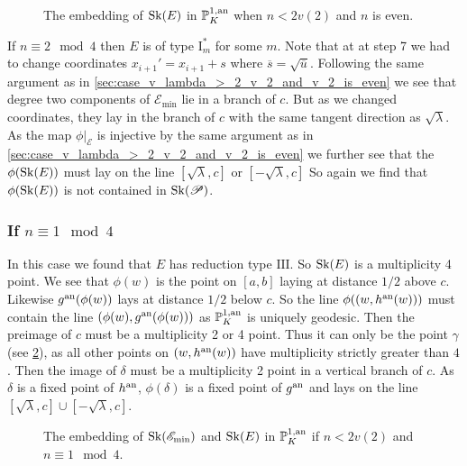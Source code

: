 \begin{figure}[h]
    \centering
    \caption{The embedding of $\operatorname{Sk}(E)$ in $\mathbb{P}^{1, \text{an}}_K$ when $n < 2v(2)$ and  $n$ is even.}
    \label{fig:image_skeleton_wild_n_le_2v2_n_even}
\end{figure}
\medskip 
If $n \equiv 2 \mod 4$ then $E$ is of type $\mathrm I_{m}^*$ for some $m$. 
Note that at at step 7 we had to change coordinates $x_{i+1}' = x_{i + 1}  + s$ where $\overline{s} = \sqrt{\overline{u}} $. 
Following the same argument as in \cref{sec:case_v_lambda_>_2_v_2_and_v_2_is_even} we see that degree two components of $\mathscr E_\text{min} $ lie in a branch of $c$. 
But as we changed coordinates, they lay in the branch of $c$ with the same tangent direction as $\sqrt{\lambda} $. 
As the map $\phi|_{\mathscr E}$ is injective by the same argument as in \cref{sec:case_v_lambda_>_2_v_2_and_v_2_is_even} we further see that the $\phi(\sk(E))$ must lay on the line $[\sqrt{\lambda}, c] $ or $[-\sqrt{\lambda} , c]$
So again we find that $\phi(\sk (E))$ is not contained in $\operatorname{Sk}(\mathscr P)$. 



\subsubsection{If $n \equiv 1 \mod 4$} \label{sec:if_n_equiv_1_mod_4$}

In this case we found that $E$ has reduction type $\mathrm{III}$. 
So $\operatorname{Sk}(E)$ is a multiplicity 4 point. 
We see that $\phi(w)$ is the point on $[a, b]$ laying at distance $1 /2$ above $c$. 
Likewise  $g\an(\phi(w))$ lays at distance $1 / 2$ below $c$. 
So the line $\phi((w, h\an(w)))$ must contain the line $(\phi(w), g\an(\phi(w)))$ as  $\mathbb{P}^{1, \text{an}}_K$ is uniquely geodesic. 
Then the preimage of $c$ must be a multiplicity 2 or 4 point. Thus it can only be the point $\gamma$ (see \cref{fig:type_iii_to_sk_p}), as all other points on $(w, h{}^{\text{an}}(w))$ have multiplicity strictly greater than  $4$. 
Then the image of $\delta$ must be a multiplicity 2  point in a vertical branch of $c$.
As $\delta$ is a fixed point of $h{}^{\text{an}}$, $\phi(\delta)$ is a fixed point of $g{}^{\text{an}}$ and lays on the line $[\sqrt{\lambda} , c] \cup [-\sqrt{\lambda} , c]$.

\begin{figure}[ht]
    \centering
    \caption{The embedding of $\operatorname{Sk}(\mathscr E_\text{min}) $ and $\operatorname{Sk}(E)$ in $\mathbb{P}^{1, \text{an}}_K$ if $n < 2v(2)$ and $n \equiv 1 \mod 4 $.}
    \label{fig:type_iii_to_sk_p}
\end{figure}



